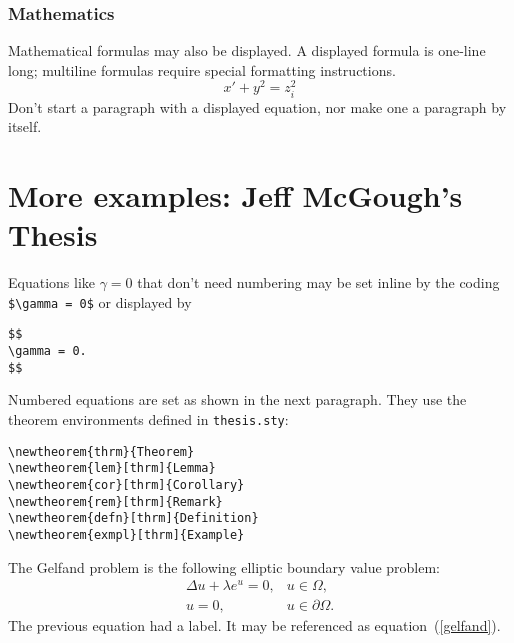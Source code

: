 \subsubsection{Mathematics}
Mathematical formulas may also be displayed.  A displayed formula is
one-line long; multiline formulas require special formatting
instructions.
   \[  x' + y^{2} = z_{i}^{2}\]
Don't start a paragraph with a displayed equation, nor make
one a paragraph by itself.

\section{More examples: Jeff McGough's Thesis}

Equations like
$\gamma = 0$ that don't need numbering may
be
set inline by the coding \verb"$\gamma = 0$" or displayed by
\par
\begin{singlespace}
\begin{verbatim}
$$
\gamma = 0.
$$
\end{verbatim}
\end{singlespace}
\par
Numbered equations are set as shown in the next paragraph. They use the
theorem environments defined in \verb"thesis.sty":
\par
\begin{singlespace}
\begin{verbatim}
\newtheorem{thrm}{Theorem}
\newtheorem{lem}[thrm]{Lemma}
\newtheorem{cor}[thrm]{Corollary}
\newtheorem{rem}[thrm]{Remark}
\newtheorem{defn}[thrm]{Definition}
\newtheorem{exmpl}[thrm]{Example}
\end{verbatim}
\end{singlespace}
\par

The Gelfand problem is the following elliptic boundary value problem:
%
%
\def\dd{\displaystyle}
\begin{equation}\label{gelfand}
\begin{array}{rl}
\dd \Delta u + \lambda e^u = 0, &
\dd u\in \Omega,\\[8pt] %
\dd u=0, & \dd u\in\partial\Omega.
\end{array}
\end{equation}
The previous equation had a label.  It may be referenced as
equation~(\ref{gelfand}).

